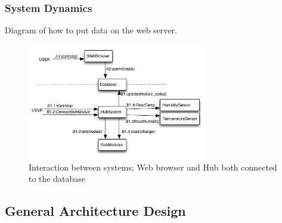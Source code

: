 	\subsubsection{System Dynamics}
			Diagram of how to put data on the web server.
			\begin{figure}[h!]		%
			\begin{centering}
				 \includegraphics[width=0.7\textwidth]{images/communication_diagram.png}
				\caption{Interaction between systems; Web browser and Hub both connected to the database}
		 	\end{centering}
		\end{figure}		
\subsection{General Architecture Design}
